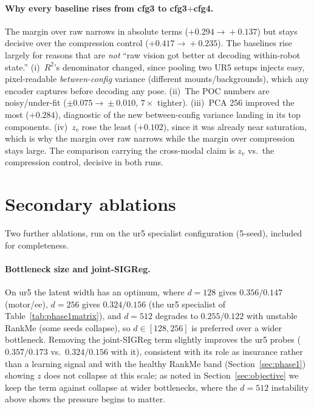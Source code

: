 \documentclass{article}
\begin{document}
\paragraph{Why every baseline rises from cfg3 to cfg3$+$cfg4.}
The margin over raw narrows in absolute terms ($+0.294\!\rightarrow\!+0.137$) but stays decisive over the compression control ($+0.417\!\rightarrow\!+0.235$). The baselines rise largely for reasons that are \emph{not} ``raw vision got better at decoding within-robot state.'' (i)~$R^2$'s denominator changed, since pooling two UR5 setups injects easy, pixel-readable \emph{between-config} variance (different mounts/backgrounds), which any encoder captures before decoding any pose. (ii)~The POC numbers are noisy/under-fit ($\pm0.075\!\rightarrow\!\pm0.010$, $7\times$ tighter). (iii)~PCA 256 improved the most ($+0.284$), diagnostic of the new between-config variance landing in its top components. (iv)~$z_v$ rose the least ($+0.102$), since it was already near saturation, which is why the margin over raw narrows while the margin over compression stays large. The comparison carrying the cross-modal claim is $z_v$ vs.\ the compression control, decisive in both runs.


\clearpage

\section{Secondary ablations}
\label{sec:moreabl}
Two further ablations, run on the ur5 specialist configuration (5-seed), included for completeness.

\paragraph{Bottleneck size and joint-SIGReg.} On ur5 the latent width has an optimum, where $d{=}128$ gives $0.356/0.147$ (motor/ee), $d{=}256$ gives $0.324/0.156$ (the ur5 specialist of Table~\ref{tab:phase1matrix}), and $d{=}512$ degrades to $0.255/0.122$ with unstable RankMe (some seeds collapse), so $d{\in}[128,256]$ is preferred over a wider bottleneck. Removing the joint-SIGReg term slightly improves the ur5 probes ($0.357/0.173$ vs.\ $0.324/0.156$ with it), consistent with its role as insurance rather than a learning signal and with the healthy RankMe band (Section~\ref{sec:phase1}) showing $z$ does not collapse at this scale; as noted in Section~\ref{sec:objective} we keep the term against collapse at wider bottlenecks, where the $d{=}512$ instability above shows the pressure begins to matter.
\end{document}
